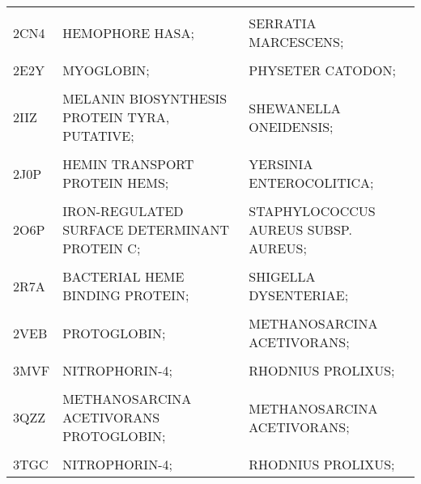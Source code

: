\begin{table}
{\begin{tabular}{lll}
			\cellcolor{gray!6}{2CJ0} & \cellcolor{gray!6}{CHLOROPEROXIDASE;} & \cellcolor{gray!6}{CALDARIOMYCES FUMAGO;}\\
			2CN4 & HEMOPHORE HASA; & SERRATIA MARCESCENS;\\
			\cellcolor{gray!6}{2CPO} & \cellcolor{gray!6}{CHLOROPEROXIDASE;} & \cellcolor{gray!6}{LEPTOXYPHIUM FUMAGO;}\\
			2E2Y & MYOGLOBIN; & PHYSETER CATODON;\\
			\addlinespace
			\cellcolor{gray!6}{2FC2} & \cellcolor{gray!6}{NITRIC OXIDE SYNTHASE;} & \cellcolor{gray!6}{BACILLUS SUBTILIS;}\\
			2IIZ & MELANIN BIOSYNTHESIS PROTEIN TYRA, PUTATIVE; & SHEWANELLA ONEIDENSIS;\\
			\cellcolor{gray!6}{2IPS} & \cellcolor{gray!6}{LACTOPEROXIDASE;} & \cellcolor{gray!6}{BOS TAURUS;}\\
			2J0P & HEMIN TRANSPORT PROTEIN HEMS; & YERSINIA ENTEROCOLITICA;\\
			\cellcolor{gray!6}{2J18} & \cellcolor{gray!6}{CHLOROPEROXIDASE;} & \cellcolor{gray!6}{CALDARIOMYCES FUMAGO;}\\
			\addlinespace
			2O6P & IRON-REGULATED SURFACE DETERMINANT PROTEIN C; & STAPHYLOCOCCUS AUREUS SUBSP. AUREUS;\\
			\cellcolor{gray!6}{2Q6N} & \cellcolor{gray!6}{CYTOCHROME P450 2B4;} & \cellcolor{gray!6}{ORYCTOLAGUS CUNICULUS;}\\
			2R7A & BACTERIAL HEME BINDING PROTEIN; & SHIGELLA DYSENTERIAE;\\
			\cellcolor{gray!6}{2SPL} & \cellcolor{gray!6}{MYOGLOBIN;} & \cellcolor{gray!6}{PHYSETER CATODON;}\\
			2VEB & PROTOGLOBIN; & METHANOSARCINA ACETIVORANS;\\
			\addlinespace
			\cellcolor{gray!6}{3HX9} & \cellcolor{gray!6}{PROTEIN RV3592;} & \cellcolor{gray!6}{MYCOBACTERIUM TUBERCULOSIS;}\\
			3MVF & NITROPHORIN-4; & RHODNIUS PROLIXUS;\\
			\cellcolor{gray!6}{3QZN} & \cellcolor{gray!6}{IRON-REGULATED SURFACE DETERMINANT PROTEIN A;} & \cellcolor{gray!6}{STAPHYLOCOCCUS AUREUS SUBSP. AUREUS;}\\
			3QZZ & METHANOSARCINA ACETIVORANS PROTOGLOBIN; & METHANOSARCINA ACETIVORANS;\\
			\cellcolor{gray!6}{3SIK} & \cellcolor{gray!6}{CONSERVED DOMAIN PROTEIN;} & \cellcolor{gray!6}{BACILLUS ANTHRACIS;}\\
			\addlinespace
			3TGC & NITROPHORIN-4; & RHODNIUS PROLIXUS;\\

\end{tabular}}
\end{table}
